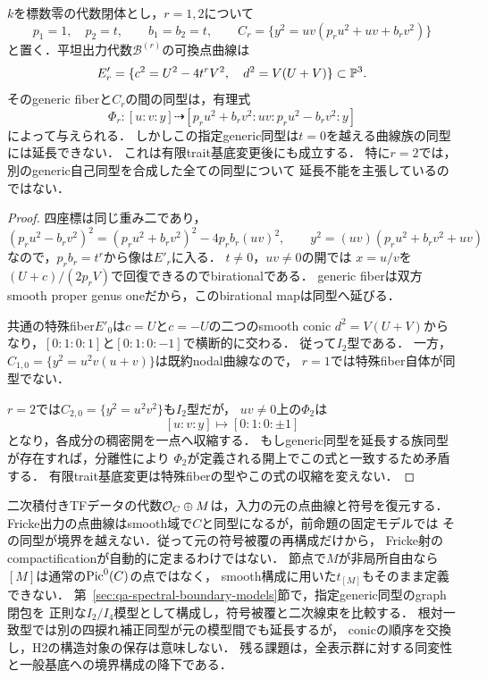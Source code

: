 \begin{proposition}[二つのtraitでのgeneric同型と特殊曲線の相違]
\label{prop:qa-tf-spectral-flat-model-point-curve}
$k$を標数零の代数閉体とし，$r=1,2$について
\[
 p_1=1,\quad p_2=t,\qquad b_1=b_2=t,
 \qquad
 C_r=\{y^2=uv(p_ru^2+uv+b_rv^2)\}
\]
と置く．平坦出力代数$\mathcal B^{(r)}$の可換点曲線は
\[
 E'_r=\{c^2=U^2-4t^rV^2,\quad d^2=V(U+V)\}\subset\mathbb P^3.
\]
そのgeneric fiberと$C_r$の間の同型は，有理式
\[
 \Phi_r:[u:v:y]\dashrightarrow
 [p_ru^2+b_rv^2:uv:p_ru^2-b_rv^2:y]
\]
によって与えられる．
しかしこの指定generic同型は$t=0$を越える曲線族の同型には延長できない．
これは有限trait基底変更後にも成立する．
特に$r=2$では，別のgeneric自己同型を合成した全ての同型について
延長不能を主張しているのではない．
\end{proposition}
\begin{proof}
四座標は同じ重み二であり，
\[
 (p_ru^2-b_rv^2)^2=(p_ru^2+b_rv^2)^2-4p_rb_r(uv)^2,
 \qquad y^2=(uv)(p_ru^2+b_rv^2+uv)
\]
なので，$p_rb_r=t^r$から像は$E'_r$に入る．
$t\ne0$，$uv\ne0$の開では
$x=u/v$を$(U+c)/(2p_rV)$で回復できるのでbirationalである．
generic fiberは双方smooth proper genus oneだから，このbirational mapは同型へ延びる．

共通の特殊fiber$E'_0$は$c=U$と$c=-U$の二つのsmooth conic
$d^2=V(U+V)$からなり，$[0:1:0:1]$と$[0:1:0:-1]$で横断的に交わる．
従って$I_2$型である．
一方，$C_{1,0}=\{y^2=u^2v(u+v)\}$は既約nodal曲線なので，
$r=1$では特殊fiber自体が同型でない．

$r=2$では$C_{2,0}=\{y^2=u^2v^2\}$も$I_2$型だが，
$uv\ne0$上の$\Phi_2$は
\[
                     [u:v:y]\longmapsto[0:1:0:\pm1]
\]
となり，各成分の稠密開を一点へ収縮する．
もしgeneric同型を延長する族同型が存在すれば，分離性により
$\Phi_2$が定義される開上でこの式と一致するため矛盾する．
有限trait基底変更は特殊fiberの型やこの式の収縮を変えない．
\end{proof}

\begin{remark}[再構成と境界双対化の区別]
二次積付きTFデータの代数$\mathcal O_C\oplus M$は，入力の元の点曲線と符号を復元する．
Fricke出力の点曲線はsmooth域で$C$と同型になるが，前命題の固定モデルでは
その同型が境界を越えない．従って元の符号被覆の再構成だけから，
Fricke射のcompactificationが自動的に定まるわけではない．
節点で$M$が非局所自由なら$[M]$は通常の$\operatorname{Pic}^0(C)$の点ではなく，
smooth構成に用いた$t_{[M]}$もそのまま定義できない．
第~\ref{sec:qa-spectral-boundary-models}節で，指定generic同型のgraph閉包を
正則な$I_2/I_4$模型として構成し，符号被覆と二次線束を比較する．
根対一致型では別の四捩れ補正同型が元の模型間でも延長するが，
conicの順序を交換し，H2の構造対象の保存は意味しない．
残る課題は，全表示群に対する同変性と一般基底への境界構成の降下である．
\end{remark}
